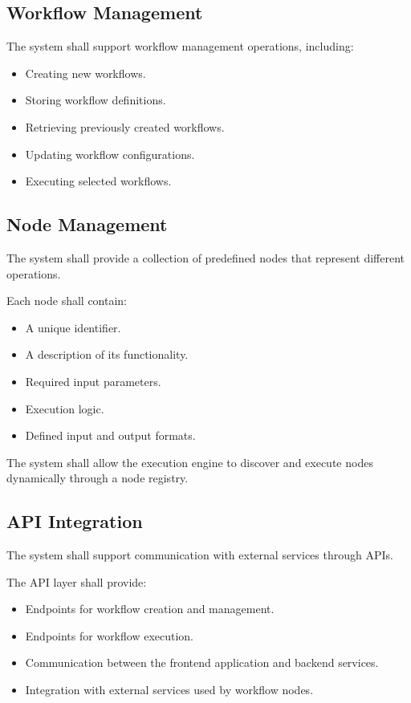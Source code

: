 \subsection{Workflow Management}

The system shall support workflow management operations, including:

\begin{itemize}
    \item Creating new workflows.
    \item Storing workflow definitions.
    \item Retrieving previously created workflows.
    \item Updating workflow configurations.
    \item Executing selected workflows.
\end{itemize}

\subsection{Node Management}

The system shall provide a collection of predefined nodes that represent different operations.

Each node shall contain:

\begin{itemize}
    \item A unique identifier.
    \item A description of its functionality.
    \item Required input parameters.
    \item Execution logic.
    \item Defined input and output formats.
\end{itemize}

The system shall allow the execution engine to discover and execute nodes dynamically through a node registry.

\subsection{API Integration}

The system shall support communication with external services through APIs.

The API layer shall provide:

\begin{itemize}
    \item Endpoints for workflow creation and management.
    \item Endpoints for workflow execution.
    \item Communication between the frontend application and backend services.
    \item Integration with external services used by workflow nodes.
\end{itemize}


